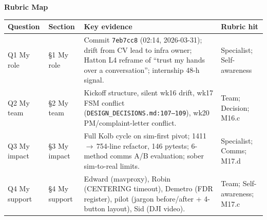\documentclass[11pt,a4paper]{article}
\begin{document}


\begin{center}
{\large\bfseries Rubric Map}
\end{center}
\vspace{-0.4em}
\begin{tabularx}{\textwidth}{@{}l l >{\raggedright\arraybackslash}X l@{}}
\toprule
\textbf{Question} & \textbf{Section} & \textbf{Key evidence} & \textbf{Rubric hit} \\
\midrule
Q1 My role       & \S1 My role    & Commit \texttt{7eb7cc8} (02:14, 2026-03-31); drift from CV lead to infra owner; Hatton L4 reframe of ``trust my hands over a conversation''; internship 48-h signal. & Specialist; Self-awareness \\
Q2 My team       & \S2 My team    & Kickoff structure, silent wk16 drift, wk17 FSM conflict (\texttt{DESIGN\_DECISIONS.md:107--109}), wk20 PM/complaint-letter conflict. & Team; Decision; M16.c \\
Q3 My impact     & \S3 My impact  & Full Kolb cycle on sim-first pivot; 1411\,$\to$\,754-line refactor, 146 pytests; 6-method comms A/B evaluation; sober sim-to-real limits. & Specialist; Comms; M17.d \\
Q4 My support    & \S4 My support & Edward (mavproxy), Robin (CENTERING timeout), Demetro (FDR register), pilot (jargon before/after + 4-button layout), Sid (DJI video). & Team; Self-awareness; M17.c \\
\bottomrule
\end{tabularx}

\vspace{0.6em}





\end{document}
